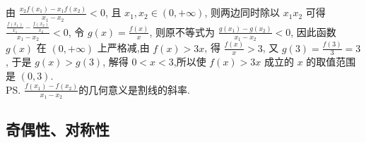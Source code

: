 \begin{enumerate}
\begin{jieda}
    由 $\frac{x_{2} f\left(x_{1}\right)-x_{1} f\left(x_{2}\right)}{x_{1}-x_{2}}<0$, 且 $x_{1}, x_{2} \in(0,+\infty)$, 则两边同时除以 $x_{1} x_{2}$ 可得 $\frac{\frac{f\left(x_{1}\right)}{x_{1}}-\frac{f\left(x_{2}\right)}{x_{2}}}{x_{1}-x_{2}}<0$,
    令 $g(x)=\frac{f(x)}{x}$, 则原不等式为 $\frac{g\left(x_{1}\right)-g\left(x_{2}\right)}{x_{1}-x_{2}}<0$, 因此函数 $g(x)$ 在 $(0,+\infty)$ 上严格减,由 $f(x)>3 x$, 得 $\frac{f(x)}{x}>3$, 又 $g(3)=\frac{f(3)}{3}=3$, 于是 $g(x)>g(3)$, 解得 $0<x<3$,所以使 $f(x)>3 x$ 成立的 $x$ 的取值范围是 $(0,3)$. \\
    \ps $\frac{f(x_1) - f(x_2)}{x_1 - x_2}$的几何意义是割线的斜率.
    \end{jieda}
\end{enumerate}
\subsection*{奇偶性、对称性}
